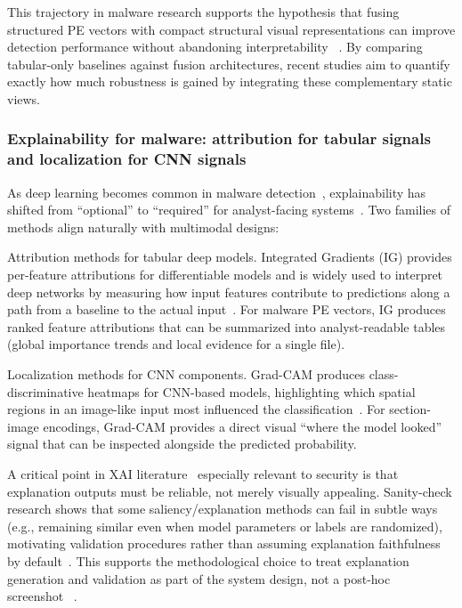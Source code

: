 \documentclass[conference]{IEEEtran}
\begin{document}
This trajectory in malware research supports the hypothesis that fusing structured PE vectors with compact structural visual representations can improve detection performance without abandoning interpretability~\cite{SZS25} \cite{SCDVPB2017}. By comparing tabular-only baselines against fusion architectures, recent studies aim to quantify exactly how much robustness is gained by integrating these complementary static views.

\subsubsection{Explainability for malware: attribution for tabular signals and localization for CNN signals}

As deep learning becomes common in malware detection~\cite{KBSSSK2025}, explainability has shifted from “optional” to “required” for analyst-facing systems~\cite{NSDSP2025}. Two families of methods align naturally with multimodal designs:

Attribution methods for tabular deep models. Integrated Gradients (IG) provides per-feature attributions for differentiable models and is widely used to interpret deep networks by measuring how input features contribute to predictions along a path from a baseline to the actual input~\cite{MAQ2017}. For malware PE vectors, IG produces ranked feature attributions that can be summarized into analyst-readable tables (global importance trends and local evidence for a single file).

Localization methods for CNN components. Grad-CAM produces class-discriminative heatmaps for CNN-based models, highlighting which spatial regions in an image-like input most influenced the classification~\cite{SCDVPB2017}. For section-image encodings, Grad-CAM provides a direct visual “where the model looked” signal that can be inspected alongside the predicted probability.

A critical point in XAI literature~\cite{DJRLXSWB2020} \cite{NSDSP2025} especially relevant to security is that explanation outputs must be reliable, not merely visually appealing. Sanity-check research shows that some saliency/explanation methods can fail in subtle ways (e.g., remaining similar even when model parameters or labels are randomized), motivating validation procedures rather than assuming explanation faithfulness by default~\cite{JJMIMB2018}. This supports the methodological choice to treat explanation generation and validation as part of the system design, not a post-hoc screenshot~\cite{SCDVPB2017} \cite{MAQ2017} \cite{JJMIMB2018}.
\end{document}
